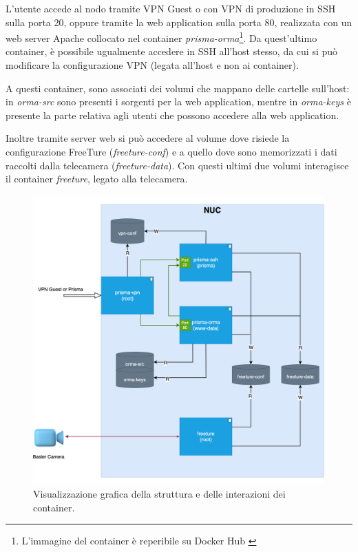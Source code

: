 L'utente accede al nodo tramite VPN Guest o con VPN di produzione in SSH sulla porta 20, oppure tramite la web application sulla porta 80, realizzata con un web server Apache collocato nel container \emph{prisma-orma}\footnote{L'immagine del container è reperibile su Docker Hub \cite{orma-webmin}}. Da quest'ultimo container, è possibile ugualmente accedere in SSH all'host stesso, da cui si può modificare la configurazione VPN (legata all'host e non ai container). 

A questi container, sono associati dei volumi che mappano delle cartelle sull'host: in \emph{orma-src} sono presenti i sorgenti per la web application, mentre in \emph{orma-keys} è presente la parte relativa agli utenti che possono accedere alla web application.

Inoltre tramite server web si può accedere al volume dove risiede la configurazione FreeTure (\emph{freeture-conf}) e a quello dove sono memorizzati i dati raccolti dalla telecamera (\emph{freeture-data}).
Con questi ultimi due volumi interagisce il container \emph{freeture}, legato alla telecamera.

\begin{figure}
\begin{center}
\includegraphics[width=\textwidth]{images/docker-arch.png} 
\caption{Visualizzazione grafica della struttura e delle interazioni dei container.}
\label{fig:containers-arch}
\end{center}
\end{figure}

